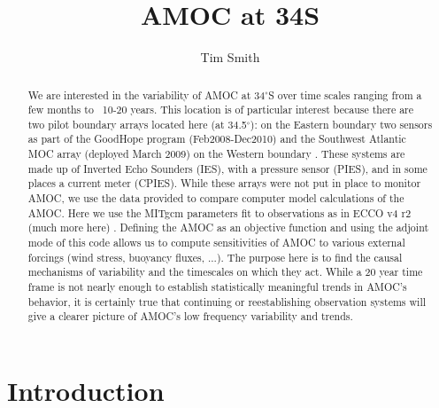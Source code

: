 \documentclass[a4paper,11pt]{article}
\title{\vspace{-10ex}AMOC at 34S}
\author{Tim Smith}
\date{\vspace{-3ex}}
\begin{document}
\maketitle

\begin{abstract}
  
  We are interested in the variability of AMOC at 34$^{\circ}$S over time scales ranging from a few months to ~10-20 years. This location is of particular interest because there are two pilot boundary arrays located here (at 34.5$^{\circ}$): on the Eastern boundary two sensors as part of the GoodHope program (Feb2008-Dec2010) and the Southwest Atlantic MOC array (deployed March 2009) on the Western boundary \cite{meinenSamoc}. These systems are made up of Inverted Echo Sounders (IES), with a pressure sensor (PIES), and in some places a current meter (CPIES). While these arrays were not put in place to monitor AMOC, we use the data provided to compare computer model calculations of the AMOC. Here we use the MITgcm parameters fit to observations as in ECCO v4 r2 (much more here) \cite{forgetEccov4}. Defining the AMOC as an objective function and using the adjoint mode of this code allows us to compute sensitivities of AMOC to various external forcings (wind stress, buoyancy fluxes, ...). The purpose here is to find the causal mechanisms of variability and the timescales on which they act. While a 20 year time frame is not nearly enough to establish statistically meaningful trends in AMOC's behavior, it is certainly true that continuing or reestablishing observation systems will give a clearer picture of AMOC's low frequency variability and trends. 
\end{abstract}

\section{Introduction} 
\label{intro}
	
\end{document}
